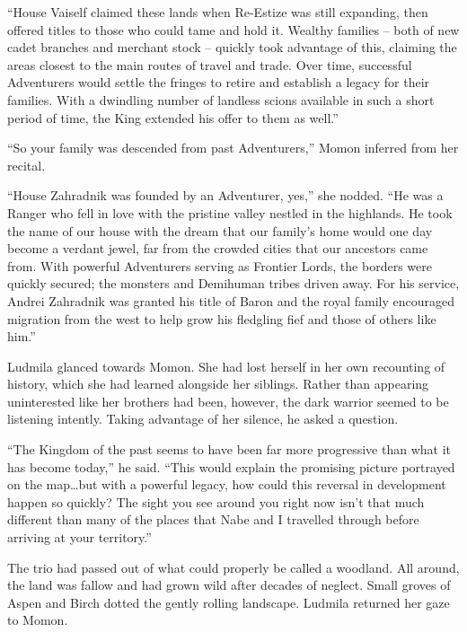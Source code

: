  

“House Vaiself claimed these lands when Re-Estize was still expanding, then offered titles to those who could tame and hold it. Wealthy families – both of new cadet branches and merchant stock – quickly took advantage of this, claiming the areas closest to the main routes of travel and trade. Over time, successful Adventurers would settle the fringes to retire and establish a legacy for their families. With a dwindling number of landless scions available in such a short period of time, the King extended his offer to them as well.”

 

“So your family was descended from past Adventurers,” Momon inferred from her recital.

 

“House Zahradnik was founded by an Adventurer, yes,” she nodded. “He was a Ranger who fell in love with the pristine valley nestled in the highlands. He took the name of our house with the dream that our family’s home would one day become a verdant jewel, far from the crowded cities that our ancestors came from. With powerful Adventurers serving as Frontier Lords, the borders were quickly secured; the monsters and Demihuman tribes driven away. For his service, Andrei Zahradnik was granted his title of Baron and the royal family encouraged migration from the west to help grow his fledgling fief and those of others like him.”

 

Ludmila glanced towards Momon. She had lost herself in her own recounting of history, which she had learned alongside her siblings. Rather than appearing uninterested like her brothers had been, however, the dark warrior seemed to be listening intently. Taking advantage of her silence, he asked a question.

 

“The Kingdom of the past seems to have been far more progressive than what it has become today,” he said. “This would explain the promising picture portrayed on the map…but with a powerful legacy, how could this reversal in development happen so quickly? The sight you see around you right now isn’t that much different than many of the places that Nabe and I travelled through before arriving at your territory.”

 

The trio had passed out of what could properly be called a woodland. All around, the land was fallow and had grown wild after decades of neglect. Small groves of Aspen and Birch dotted the gently rolling landscape. Ludmila returned her gaze to Momon.

